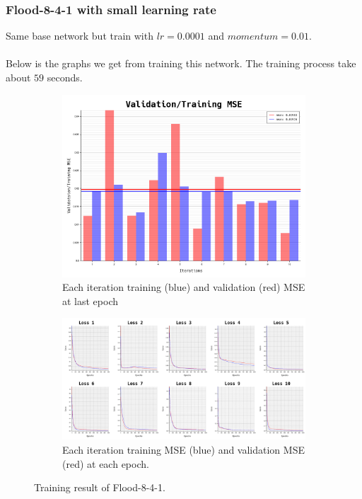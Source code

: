 \documentclass{article}
\begin{document}
\newpage
\subsubsection*{Flood-8-4-1 with small learning rate}
Same base network but train with $lr = 0.0001$ and $momentum = 0.01$.
\\ \\
Below is the graphs we get from training this network. The training process take about $59$ seconds.
\begin{figure}[ht]
	\begin{subfigure}{\textwidth}
		\centering
		\includegraphics[scale=0.3]{flood-8-4-1_3/cv_l}
		\caption{Each iteration training (blue) and validation (red) MSE at last epoch}
	\end{subfigure}
	\begin{subfigure}{\textwidth}
		\includegraphics[width=\textwidth]{flood-8-4-1_3/loss}
		\caption{Each iteration training MSE (blue) and validation MSE (red) at each epoch.}
	\end{subfigure}
	\caption{Training result of Flood-8-4-1.}
	\label{fig:4}
\end{figure}
\FloatBarrier
\end{document}
